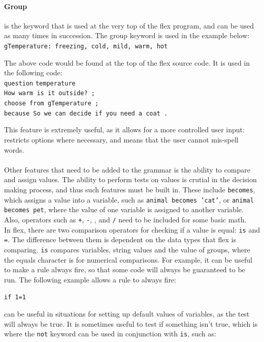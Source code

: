 \documentclass[12pt]{report}
\begin{document}
\paragraph{Group} is the keyword that is used at the very top of the flex program, and can be used as many times in succession.  The group keyword is used in the example below:
\texttt{gTemperature: freezing, cold, mild, warm, hot}\\
\begin{tabbing}
The above code would be found at the top of the flex source code.  It is used in the following code:\\
\texttt{question} \= \texttt{temperature}\\
\> \texttt{How warm is it outside? ;}\\
\> \texttt{choose from gTemperature ;}\\
\> \texttt{because So we can decide if you need a coat .}\\
\end{tabbing}
This feature is extremely useful, as it allows for a more controlled user input: restricts options where necessary, and means that the user cannot mis-spell words.
\\
\\
Other features that need to be added to the grammar is the ability to compare and assign values.  The ability to perform tests on values is crutial in the decision making process, and thus such features must be built in.  These include \texttt{becomes}, which assigns a value into a variable, such as \texttt{animal becomes 'cat'}, or \texttt{animal becomes pet}, where the value of one variable is assigned to another variable.  Also, operators such as \texttt{+}, \texttt{-}, \texttt{\*}, and \texttt{/} need to be included for some basic math.\\
In flex, there are two comparison operators for checking if a value is equal: \texttt{is} and \texttt{=}.  The difference between them is dependent on the data types that flex is comparing.  \texttt{is} compares variables, string values and the value of groups, where the equals character is for numerical comparisons.  For example, it can be useful to make a rule always fire, so that some code will always be guaranteed to be run.  The following example allows a rule to always fire:\\
\begin{center}
\texttt{if 1=1}
\end{center}
can be useful in situations for setting up default values of variables, as the test will always be true.  It is sometimes useful to test if something isn't true, which is where the \texttt{not} keyword can be used in conjunction with \texttt{is}, such as:\\
\end{document}
